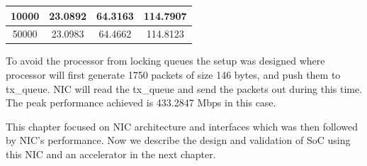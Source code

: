 \documentclass[12pt]{report}
\begin{document}
\begin{table}[htbp]
\begin{center}
\begin{tabular}{|c|c|c|c|}
                                        \hline
                                        10000                   & 23.0892                       & 64.3163                       & 114.7907\\
                                        \hline
                                        50000                   & 23.0983                       & 64.4662                       & 114.8123\\
                                        \hline
                                \end{tabular}
                                \label{table_dataRate}
                        \end{center}
                \end{table}

        To avoid the processor from locking queues the setup was designed where processor will first generate 1750 packets of size 146 bytes, and push them to tx\_queue. NIC will read the tx\_queue and send the packets out during this time. The peak performance achieved is 433.2847 Mbps in this case.
 
 
	 This chapter focused on NIC architecture and interfaces which was then followed by NIC's performance. Now we describe the design and validation of SoC using this NIC and an accelerator in the next chapter.
\end{document}
